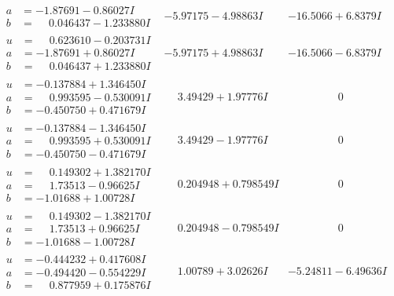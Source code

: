 \documentclass[1p]{elsarticle_modified}
\theoremstyle{definition}
\begin{document}
$$\begin{array}{c|c|c}
\begin{aligned}
a &= -1.87691 - 0.86027 I \\
b &= \phantom{-}0.046437 - 1.233880 I\end{aligned}
 & -5.97175 - 4.98863 I & -16.5066 + 6.8379 I \\ \hline\begin{aligned}
u &= \phantom{-}0.623610 - 0.203731 I \\
a &= -1.87691 + 0.86027 I \\
b &= \phantom{-}0.046437 + 1.233880 I\end{aligned}
 & -5.97175 + 4.98863 I & -16.5066 - 6.8379 I \\ \hline\begin{aligned}
u &= -0.137884 + 1.346450 I \\
a &= \phantom{-}0.993595 - 0.530091 I \\
b &= -0.450750 + 0.471679 I\end{aligned}
 & \phantom{-}3.49429 + 1.97776 I & \phantom{-0.000000 } 0 \\ \hline\begin{aligned}
u &= -0.137884 - 1.346450 I \\
a &= \phantom{-}0.993595 + 0.530091 I \\
b &= -0.450750 - 0.471679 I\end{aligned}
 & \phantom{-}3.49429 - 1.97776 I & \phantom{-0.000000 } 0 \\ \hline\begin{aligned}
u &= \phantom{-}0.149302 + 1.382170 I \\
a &= \phantom{-}1.73513 - 0.96625 I \\
b &= -1.01688 + 1.00728 I\end{aligned}
 & \phantom{-}0.204948 + 0.798549 I & \phantom{-0.000000 } 0 \\ \hline\begin{aligned}
u &= \phantom{-}0.149302 - 1.382170 I \\
a &= \phantom{-}1.73513 + 0.96625 I \\
b &= -1.01688 - 1.00728 I\end{aligned}
 & \phantom{-}0.204948 - 0.798549 I & \phantom{-0.000000 } 0 \\ \hline\begin{aligned}
u &= -0.444232 + 0.417608 I \\
a &= -0.494420 - 0.554229 I \\
b &= \phantom{-}0.877959 + 0.175876 I\end{aligned}
 & \phantom{-}1.00789 + 3.02626 I & -5.24811 - 6.49636 I \\ \hline\begin{aligned}

\end{aligned}
\end{array}$$
\end{document}
